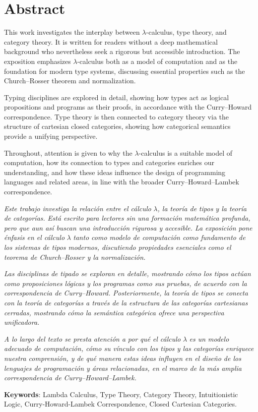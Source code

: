 

\chapter*{Abstract}


\noindent This work investigates the interplay between $\lambda$-calculus, type theory, and category theory. It is written for readers without a deep mathematical background who nevertheless seek a rigorous but accessible introduction. The exposition emphasizes $\lambda$-calculus both as a model of computation and as the foundation for modern type systems, discussing essential properties such as the Church--Rosser theorem and normalization.

Typing disciplines are explored in detail, showing how types act as logical propositions and programs as their proofs, in accordance with the Curry--Howard correspondence. Type theory is then connected to category theory via the structure of cartesian closed categories, showing how categorical semantics provide a unifying perspective.

Throughout, attention is given to why the $\lambda$-calculus is a suitable model of computation, how its connection to types and categories enriches our understanding, and how these ideas influence the design of programming languages and related areas, in line with the broader Curry--Howard--Lambek correspondence.

\vspace*{0.7cm}

\noindent
\textit{Este trabajo investiga la relación entre el cálculo} $\lambda$\textit{, la teoría de tipos y la teoría de categorías. 
Está escrito para lectores sin una formación matemática profunda, pero que aun así buscan una introducción rigurosa y accesible. 
La exposición pone énfasis en el cálculo} $\lambda$ \textit{tanto como modelo de computación como fundamento de los sistemas de tipos modernos, discutiendo propiedades esenciales como el teorema de Church--Rosser y la normalización.}

\textit{Las disciplinas de tipado se exploran en detalle, mostrando cómo los tipos actúan como proposiciones lógicas y los programas como sus pruebas, de acuerdo con la correspondencia de Curry--Howard. 
Posteriormente, la teoría de tipos se conecta con la teoría de categorías a través de la estructura de las categorías cartesianas cerradas, mostrando cómo la semántica categórica ofrece una perspectiva unificadora.}

\textit{A lo largo del texto se presta atención a por qué el cálculo} $\lambda$ \textit{es un modelo adecuado de computación, cómo su vínculo con los tipos y las categorías enriquece nuestra comprensión, y de qué manera estas ideas influyen en el diseño de los lenguajes de programación y áreas relacionadas, en el marco de la más amplia correspondencia de Curry--Howard--Lambek.}

\vspace*{1cm}

\noindent \textbf{Keywords}:
Lambda Calculus,
Type Theory,
Category Theory,
Intuitionistic Logic,
Curry-Howard-Lambek Correspondence,
Closed Cartesian Categories.

\newpage

